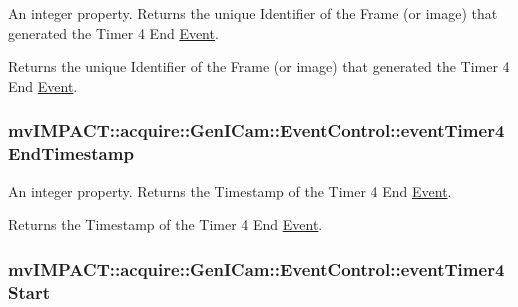 An integer property. Returns the unique Identifier of the Frame (or image) that generated the Timer 4 End \hyperlink{classmv_i_m_p_a_c_t_1_1acquire_1_1_event}{Event}. 

Returns the unique Identifier of the Frame (or image) that generated the Timer 4 End \hyperlink{classmv_i_m_p_a_c_t_1_1acquire_1_1_event}{Event}. \hypertarget{classmv_i_m_p_a_c_t_1_1acquire_1_1_gen_i_cam_1_1_event_control_a6a64b1916b4a3e9d9b3d037631c465b8}{
\subsubsection[{event\+Timer4\+End\+Timestamp}]{ mv\+I\+M\+P\+A\+C\+T\+::acquire\+::\+Gen\+I\+Cam\+::\+Event\+Control\+::event\+Timer4\+End\+Timestamp}}\label{classmv_i_m_p_a_c_t_1_1acquire_1_1_gen_i_cam_1_1_event_control_a6a64b1916b4a3e9d9b3d037631c465b8}


An integer property. Returns the Timestamp of the Timer 4 End \hyperlink{classmv_i_m_p_a_c_t_1_1acquire_1_1_event}{Event}. 

Returns the Timestamp of the Timer 4 End \hyperlink{classmv_i_m_p_a_c_t_1_1acquire_1_1_event}{Event}. \hypertarget{classmv_i_m_p_a_c_t_1_1acquire_1_1_gen_i_cam_1_1_event_control_a8413023934f6bdc2cff4c58c08c5b309}{
\subsubsection[{event\+Timer4\+Start}]{ mv\+I\+M\+P\+A\+C\+T\+::acquire\+::\+Gen\+I\+Cam\+::\+Event\+Control\+::event\+Timer4\+Start}}\label{classmv_i_m_p_a_c_t_1_1acquire_1_1_gen_i_cam_1_1_event_control_a8413023934f6bdc2cff4c58c08c5b309}


